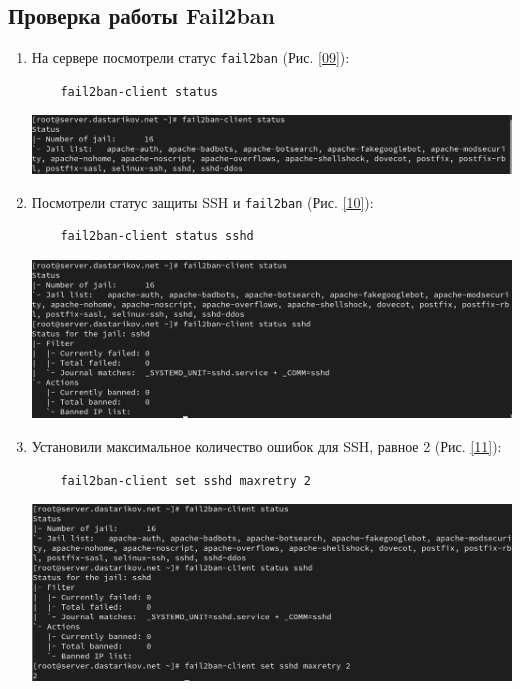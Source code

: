 \subsection{Проверка работы Fail2ban}

\begin{enumerate}
\item На сервере посмотрели статус {\tt fail2ban} (Рис. \ref{09}):
\begin{verbatim}
    fail2ban-client status
\end{verbatim}

  \begin{center}
    \centering
    \includegraphics[width=\textwidth]{../images/image09.png}
    \label{09}
  \end{center}

\item Посмотрели статус защиты SSH и {\tt fail2ban} (Рис. \ref{10}):
\begin{verbatim}
    fail2ban-client status sshd
\end{verbatim}

  \begin{center}
    \centering
    \includegraphics[width=\textwidth]{../images/image10.png}
    \label{10}
  \end{center}

\item Установили максимальное количество ошибок для SSH, равное 2 (Рис. \ref{11}):
\begin{verbatim}
    fail2ban-client set sshd maxretry 2
\end{verbatim}

  \begin{center}
    \centering
    \includegraphics[width=\textwidth]{../images/image11.png}
    \label{11}
  \end{center}


\end{enumerate}
